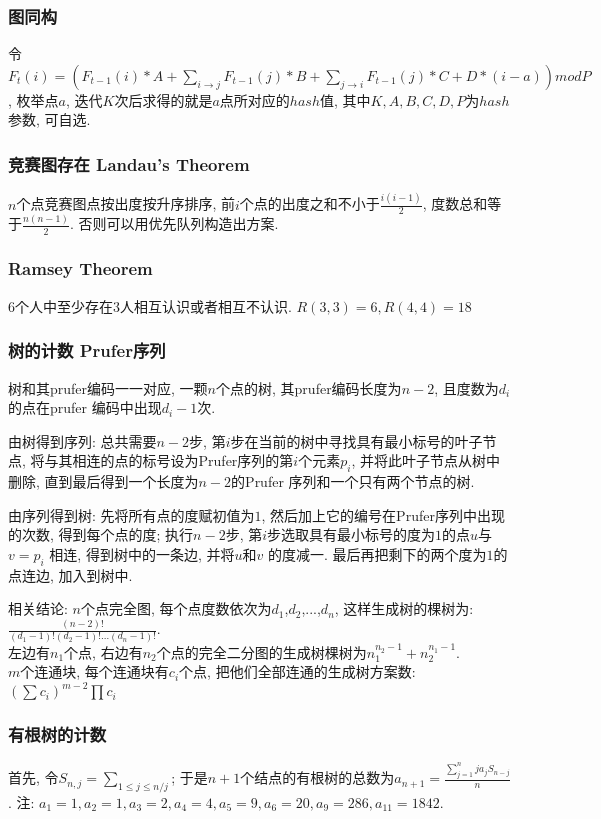 \subsubsection{图同构}
                令$F_t(i)=(F_{t-1}(i)*A+\sum_{i\to j} F_{t-1}(j)*B+\sum_{j\to i} F_{t-1}(j)*C+D*(i-a))mod P$, 枚举点$a$, 迭代$K$次后求得的就是$a$点所对应的$hash$值, 其中$K,A,B,C,D,P$为$hash$参数, 可自选. 

\subsubsection{竞赛图存在 Landau’s Theorem}
    $n$个点竞赛图点按出度按升序排序, 前$i$个点的出度之和不小于$\frac{i(i-1)}{2}$, 度数总和等于$\frac{n(n-1)}{2}$. 否则可以用优先队列构造出方案.

\subsubsection{Ramsey Theorem}
    $6$个人中至少存在$3$人相互认识或者相互不认识. $R(3,3)=6, R(4,4)=18$

\subsubsection{树的计数 Prufer序列}
    树和其prufer编码一一对应, 一颗$n$个点的树, 其prufer编码长度为${n-2}$, 且度数为$d_i$ 的点在prufer 编码中出现${d_i -1}$次. 
    \par 由树得到序列: 总共需要$n-2$步, 第$i$步在当前的树中寻找具有最小标号的叶子节点, 将与其相连的点的标号设为Prufer序列的第$i$个元素$p_i$, 并将此叶子节点从树中删除, 直到最后得到一个长度为$n-2$的Prufer 序列和一个只有两个节点的树. 
    \par 由序列得到树: 先将所有点的度赋初值为$1$, 然后加上它的编号在Prufer序列中出现的次数, 得到每个点的度; 执行$n-2$步, 第$i$步选取具有最小标号的度为$1$的点$u$与$v=p_i$ 相连, 得到树中的一条边, 并将$u$和$v$ 的度减一. 最后再把剩下的两个度为$1$的点连边, 加入到树中. 
    \par 相关结论: $n$个点完全图, 每个点度数依次为$d_1$,$d_2$,...,$d_n$, 这样生成树的棵树为: ${\frac{(n-2)!}{(d_1-1)!(d_2-1)!...(d_n-1)!}}$.\\
    左边有$n_1$个点, 右边有$n_2$个点的完全二分图的生成树棵树为$n_1^{n_2-1}+n_2^{n_1-1}$. \\
    $m$个连通块, 每个连通块有$c_i$个点, 把他们全部连通的生成树方案数: $(\sum c_i)^{m-2}\prod c_i$
\subsubsection{有根树的计数}\noindent
    首先, 令$S_{n,j}=\sum_{1\leq j\leq n/j}$; 于是$n+1$个结点的有根树的总数为$ a_{n+1}=\frac{\sum_{j=1}^nja_jS_{n-j}}{n}$. 注: $a_1=1,a_2=1,a_3=2,a_4=4,a_5=9,a_6=20,a_9=286,a_11=1842$. 
